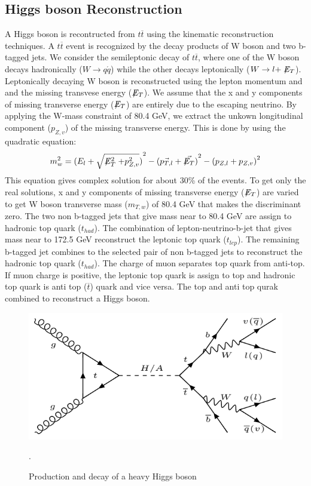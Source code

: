 \documentclass{cmspaper}
\begin{document}
\subsection{Higgs boson Reconstruction}
A Higgs boson is recontructed from $t\overline{t}$ using the kinematic reconstruction techniques. A $t\overline{t}$ event is recognized by the decay products of W boson and two b-tagged jets. We consider the semileptonic decay of $t\overline{t}$, where one of the W boson decays hadronically ($W\rightarrow q\acute{q}$) while the other decays leptonically ($W\rightarrow l + \not\mathrel{E}_{T}$). Leptonically decaying W boson is reconstructed using the lepton momentum and and the missing transvese energy ($\not\mathrel{E}_{T}$). We assume that the x and y components of missing transverse energy ($\not\mathrel{E}_{T}$) are entirely due to the escaping neutrino. By applying the W-mass constraint of 80.4 GeV, we extract the unkown longitudinal component ($p_{Z,v}$) of the missing transverse energy. This is done by using the quadratic equation:
\begin{equation}
m^{2}_{w} = {(E_{l}+\sqrt{\not\mathrel{E}^{2}_{T}+p^{2}_{Z,v}})}^{2}-{(\vec{p_{T,l}}+\vec{\not\mathrel{E}_{T}})}^{2}-{(p_{Z,l}+p_{Z,v})}^{2} 
\end{equation} 
This equation gives complex solution for about 30\% of the events. To get only the real solutions, x and y components of missing transverse energy ($\not\mathrel{E}_{T}$) are varied to get W boson transverse mass ($m_{T,w}$) of 80.4 GeV that makes the discriminant zero. The two non b-tagged jets that give mass near to 80.4 GeV are assign to hadronic top quark ($t_{had}$). The combination of lepton-neutrino-b-jet that gives mass near to 172.5 GeV reconstruct the leptonic top quark ($t_{lep}$). The remaining b-tagged jet combines to the selected pair of non b-tagged jets to reconstruct the hadronic top quark ($t_{had}$). The charge of muon separates top quark from anti-top. If muon charge is positive, the leptonic top quark is assign to top and hadronic top quark is anti top ($\overline{t}$) quark and vice versa. The top and anti top qurak combined to reconstruct a Higgs boson.
\begin{figure}[htp!]
\centering
\hspace{-0.5cm}
\includegraphics[scale=0.40]{diagrams/higgs_tottbar.png}
   \caption{Production and decay of a heavy Higgs boson}.\label{higgs_diagram}
    \end{figure}
\end{document}
